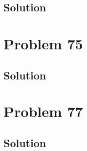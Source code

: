 \documentclass[12pt]{article}
\begin{document}
        \subsection{Solution}

    \pagebreak
    \section{Problem 75}

        \subsection{Solution}

    \pagebreak
    \section{Problem 77}

        \subsection{Solution}

    \pagebreak
    
    \tableofcontents
\end{document}
